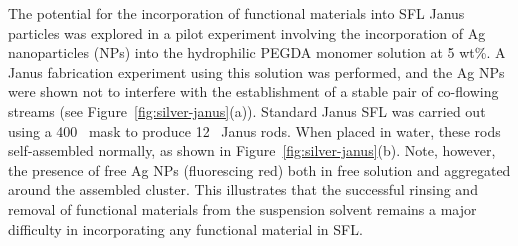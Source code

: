 The potential for the incorporation of functional materials into SFL Janus particles was 
explored in a pilot experiment involving the incorporation of Ag nanoparticles (NPs) into the
hydrophilic PEGDA monomer solution at 5 wt\%. A Janus fabrication experiment using this 
solution was performed, and the Ag NPs were shown not to interfere with the establishment of a stable
pair of co-flowing streams (see Figure~\ref{fig:silver-janus}(a)). Standard Janus SFL was carried
out using a 400 \microns~mask to produce 12 \microns~Janus rods. When placed in water, these rods
self-assembled normally, as shown in Figure~\ref{fig:silver-janus}(b).  Note, however, the presence of
free Ag NPs (fluorescing red) both in free solution and aggregated around the assembled cluster.
This illustrates that the successful 
rinsing and removal of functional materials from the suspension solvent remains 
a major difficulty in incorporating any functional material in SFL.

